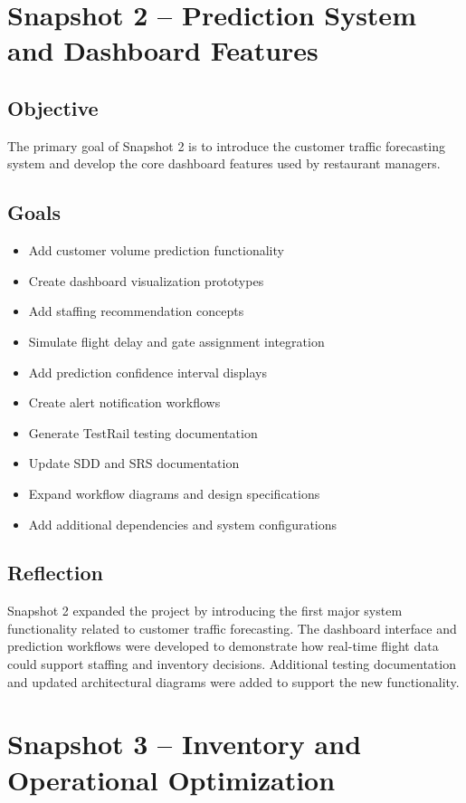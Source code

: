 \documentclass[12pt]{article}
\begin{document}
\newpage

\section{Snapshot 2 -- Prediction System and Dashboard Features}

\subsection{Objective}
The primary goal of Snapshot 2 is to introduce the customer traffic forecasting system and develop the core dashboard features used by restaurant managers.

\subsection{Goals}
\begin{itemize}
\item Add customer volume prediction functionality
\item Create dashboard visualization prototypes
\item Add staffing recommendation concepts
\item Simulate flight delay and gate assignment integration
\item Add prediction confidence interval displays
\item Create alert notification workflows
\item Generate TestRail testing documentation
\item Update SDD and SRS documentation
\item Expand workflow diagrams and design specifications
\item Add additional dependencies and system configurations
\end{itemize}

\subsection{Reflection}
Snapshot 2 expanded the project by introducing the first major system functionality related to customer traffic forecasting. The dashboard interface and prediction workflows were developed to demonstrate how real-time flight data could support staffing and inventory decisions. Additional testing documentation and updated architectural diagrams were added to support the new functionality.

\newpage

\section{Snapshot 3 -- Inventory and Operational Optimization}
\end{document}
